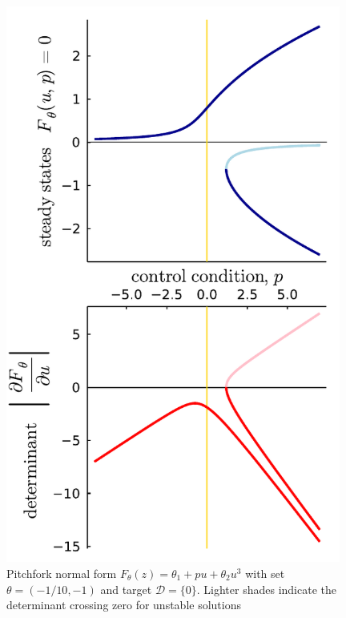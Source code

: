 \documentclass{article}[12pt]
\numberwithin{equation}{section}
\begin{document}
\begin{figure}[H]
\centering{}
\captionsetup{justification=centering}
\includegraphics[width=11cm]{docs/figures/pitchfork}
\caption{Pitchfork normal form $F_{\theta}(z) = \theta_{1} + p u+\theta_{2}u^3$ with set $\theta=(-1/10,-1)$ and target $\mathcal{D}=\{0\}$. Lighter shades indicate the determinant crossing zero for unstable solutions}
\label{fig:pitchfork}
\end{figure}
\end{document}
